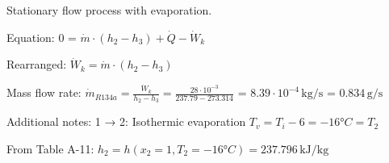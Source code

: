 Stationary flow process with evaporation.  

Equation:  
0 = \( \dot{m} \cdot (h_2 - h_3) + \dot{Q} - \dot{W}_k \)  

Rearranged:  
\( \dot{W}_k = \dot{m} \cdot (h_2 - h_3) \)  

Mass flow rate:  
\( \dot{m}_{R134a} = \frac{\dot{W}_k}{h_2 - h_3} = \frac{28 \cdot 10^{-3}}{237.79 - 273.314} \)  
= \( 8.39 \cdot 10^{-4} \, \text{kg/s} \)  
= \( 0.834 \, \text{g/s} \)  

Additional notes:  
1 → 2: Isothermic evaporation  
\( T_v = T_i - 6 = -16°C = T_2 \)  

From Table A-11:  
\( h_2 = h(x_2 = 1, T_2 = -16°C) = 237.796 \, \text{kJ/kg} \)